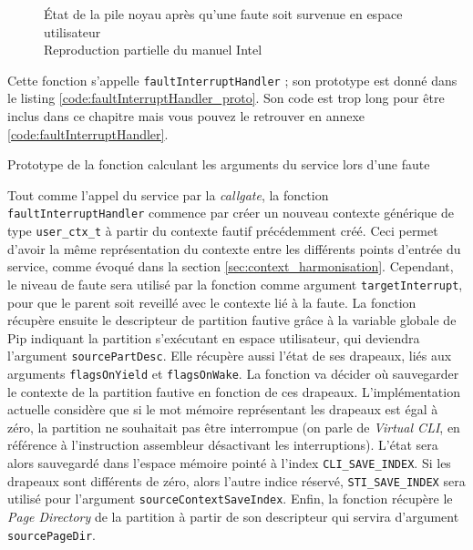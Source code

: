 		\begin{figure}[!ht]
			
			\caption{État de la pile noyau après qu'une faute soit survenue en espace utilisateur\\Reproduction partielle du manuel Intel \cite{intel_interrupt_stack}}
			\label{fig:interrupt_stack}
		\end{figure}

		Cette fonction s'appelle \texttt{faultInterruptHandler} ; son prototype est donné dans le listing \ref{code:faultInterruptHandler_proto}. Son code est trop long pour être inclus dans ce chapitre mais vous pouvez le retrouver en annexe \ref{code:faultInterruptHandler}.

		\begin{listing}[!ht]
			\caption{Prototype de la fonction calculant les arguments du service lors d'une faute}
			\label{code:faultInterruptHandler_proto}
		\end{listing}

		Tout comme l'appel du service par la \emph{callgate}, la fonction \texttt{faultInterruptHandler} commence par créer un nouveau contexte générique de type \texttt{user\_ctx\_t} à partir du contexte fautif précédemment créé. Ceci permet d'avoir la même représentation du contexte entre les différents points d'entrée du service, comme évoqué dans la section \ref{sec:context_harmonisation}. Cependant, le niveau de faute sera utilisé par la fonction comme argument \texttt{targetInterrupt}, pour que le parent soit reveillé avec le contexte lié à la faute.
		La fonction récupère ensuite le descripteur de partition fautive grâce à la variable globale de Pip indiquant la partition s'exécutant en espace utilisateur, qui deviendra l'argument \texttt{sourcePartDesc}. Elle récupère aussi l'état de ses drapeaux, liés aux arguments \texttt{flagsOnYield} et \texttt{flagsOnWake}. La fonction va décider où sauvegarder le contexte de la partition fautive en fonction de ces drapeaux. L'implémentation actuelle considère que si le mot mémoire représentant les drapeaux est égal à zéro, la partition ne souhaitait pas être interrompue (on parle de \emph{Virtual CLI}, en référence à l'instruction assembleur désactivant les interruptions). L'état sera alors sauvegardé dans l'espace mémoire pointé à l'index \texttt{CLI\_SAVE\_INDEX}. Si les drapeaux sont différents de zéro, alors l'autre indice réservé, \texttt{STI\_SAVE\_INDEX} sera utilisé pour l'argument \texttt{sourceContextSaveIndex}.
		Enfin, la fonction récupère le \emph{Page Directory} de la partition à partir de son descripteur qui servira d'argument \texttt{sourcePageDir}.

